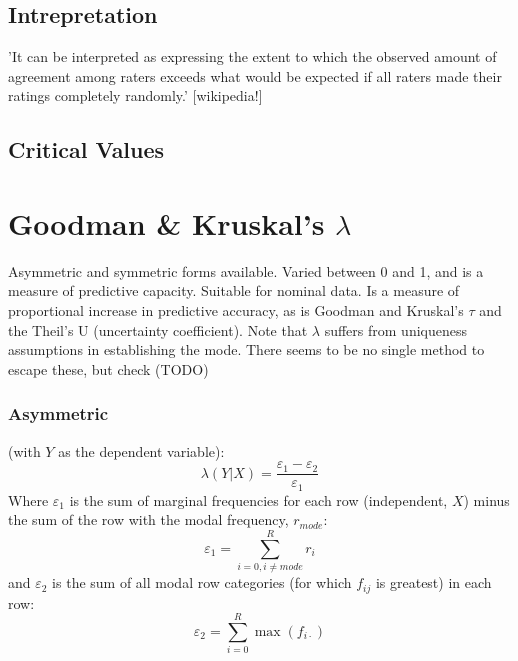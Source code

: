 \documentclass[11pt]{article}
\begin{document}
\subsection{Intrepretation}
'It can be interpreted as expressing the extent to which the observed amount of agreement among raters exceeds what would be expected if all raters made their ratings completely randomly.' [wikipedia!]

\subsection{Critical Values}



\section{Goodman \& Kruskal's $\lambda$}
Asymmetric and symmetric forms available.  Varied between 0 and 1, and is a measure of predictive capacity.  Suitable for nominal data.  Is a measure of proportional increase in predictive accuracy, as is Goodman and Kruskal's $\tau$ and the Theil's U (uncertainty coefficient).  Note that $\lambda$ suffers from uniqueness assumptions in establishing the mode.  There seems to be no single method to escape these, but check (TODO)

\subsubsection{Asymmetric}
(with $Y$ as the dependent variable):
$$
\lambda(Y|X) = \frac{ \varepsilon_1 - \varepsilon_2 }{ \varepsilon_1 }
$$
Where $\varepsilon_1$ is the sum of marginal frequencies for each row (independent, $X$) minus the sum of the row with the modal frequency, $r_{mode}$:
$$
\varepsilon_1 = \sum_{i=0, i \neq mode}^{R}{ r_i }
$$
and $\varepsilon_2$ is the sum of all modal row categories (for which $f_{ij}$ is greatest) in each row:
$$
\varepsilon_2 = \sum_{i=0}^{R}{ \max( f_{i\cdot} ) }
$$
\end{document}
